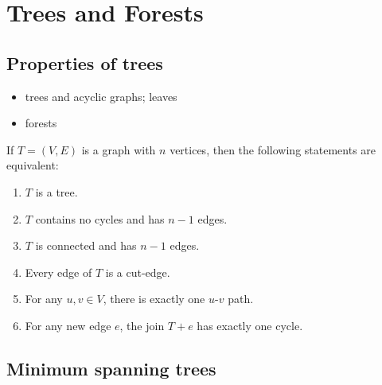 
\chapter{Trees and Forests}
\label{chap:trees_forests}



\section{Properties of trees}

\begin{itemize}
\item trees and acyclic graphs; leaves

\item forests
\end{itemize}

\begin{theorem}
If $T = (V, E)$ is a graph with $n$ vertices, then the following
statements are equivalent:
\begin{enumerate}
\item $T$ is a tree.

\item $T$ contains no cycles and has $n - 1$ edges.

\item $T$ is connected and has $n - 1$ edges.

\item Every edge of $T$ is a cut-edge.

\item For any $u,v \in V$, there is exactly one $u$-$v$ path.

\item For any new edge $e$, the join $T + e$ has exactly one cycle.
\end{enumerate}
\end{theorem}



\section{Minimum spanning trees}

